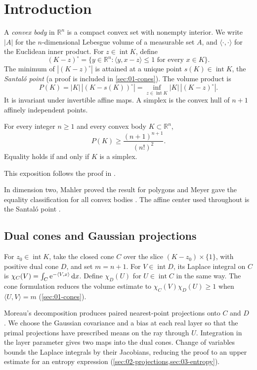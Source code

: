 \section{Introduction}\label{sec:introduction}

A \emph{convex body} in $\mathbb{R}^n$ is a compact convex set with nonempty interior.  We write $|A|$ for the $n$-dimensional Lebesgue volume of a measurable set $A$, and $\langle\cdot,\cdot\rangle$ for the Euclidean inner product. For $z\in\operatorname{int}K$, define
\[
 (K-z)^\circ
 =\{y\in\mathbb{R}^n:\langle y,x-z\rangle\le1\text{ for every }x\in K\}.
\]
The minimum of $|(K-z)^\circ|$ is attained at a unique point $s(K)\in\operatorname{int}K$, the \emph{Santal\'o point} (a proof is included in \cref{sec:01-cones}). The volume product is
\[
 P(K)=|K|\,|(K-s(K))^\circ|
     =\inf_{z\in\operatorname{int}K}|K|\,|(K-z)^\circ|.
\]
It is invariant under invertible affine maps. A simplex is the convex hull of $n+1$ affinely independent points.

\begin{maintheorem}\label{thm:mahler}
For every integer $n\ge1$ and every convex body $K\subset\mathbb{R}^n$,
\[
                 P(K)\ge\frac{(n+1)^{n+1}}{(n!)^2}.
\]
Equality holds if and only if $K$ is a simplex.
\end{maintheorem}

This exposition follows the proof in \cite{OpenAIMathSource}.

In dimension two, Mahler proved the result for polygons and Meyer gave the equality classification for all convex bodies \cite{Mahler1938,Meyer1991}. The affine center used throughout is the Santal\'o point \cite{Santalo1949}.

\subsection{Dual cones and Gaussian projections}

For $z_0\in\operatorname{int}K$, take the closed cone $C$ over the slice $(K-z_0)\times\{1\}$, with positive dual cone $D$, and set $m=n+1$. For $V\in\operatorname{int}D$, its Laplace integral on $C$ is $\chi_C(V)=\int_C\mathrm{e}^{-\langle V,x\rangle}\,\mathrm{d} x$. Define $\chi_D(U)$ for $U\in\operatorname{int}C$ in the same way. The cone formulation reduces the volume estimate to $\chi_C(V)\chi_D(U)\geq1$ when $\langle U,V\rangle=m$ (\cref{sec:01-cones}).

Moreau's decomposition produces paired nearest-point projections onto $C$ and $D$ \cite{Moreau1962}. We choose the Gaussian covariance and a bias at each real layer so that the primal projections have prescribed means on the ray through $U$. Integration in the layer parameter gives two maps into the dual cones. Change of variables bounds the Laplace integrals by their Jacobians, reducing the proof to an upper estimate for an entropy expression (\cref{sec:02-projections,sec:03-entropy}).

